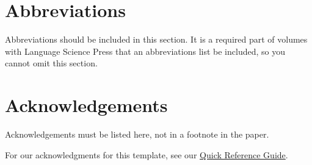 \documentclass[output=paper,colorlinks,citecolor=brown,
]{langscibook}
\begin{document}
\section*{Abbreviations}

Abbreviations should be included in this section. It is a required part of volumes with Language Science Press that an abbreviations list be included, so you cannot omit this section.

\section*{Acknowledgements}

Acknowledgements must be listed here, not in a footnote in the paper.

\noindent For our acknowledgments for this template, see our \href{https://www.overleaf.com/latex/templates/acal-proceedings-latex-quick-reference-guide/fncrcrtgnxhv}{Quick Reference Guide}. 


\sloppy %

\printbibliography[heading=subbibliography,notkeyword=this]
\end{document}
